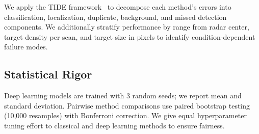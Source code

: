 \documentclass[conference]{IEEEtran}
\begin{document}
We apply the TIDE framework~\cite{Bolya2020} to decompose each method's errors into classification, localization, duplicate, background, and missed detection components. We additionally stratify performance by range from radar center, target density per scan, and target size in pixels to identify condition-dependent failure modes.

\subsection{Statistical Rigor}

Deep learning models are trained with 3 random seeds; we report mean and standard deviation. Pairwise method comparisons use paired bootstrap testing (10,000 resamples) with Bonferroni correction. We give equal hyperparameter tuning effort to classical and deep learning methods to ensure fairness.
\end{document}
